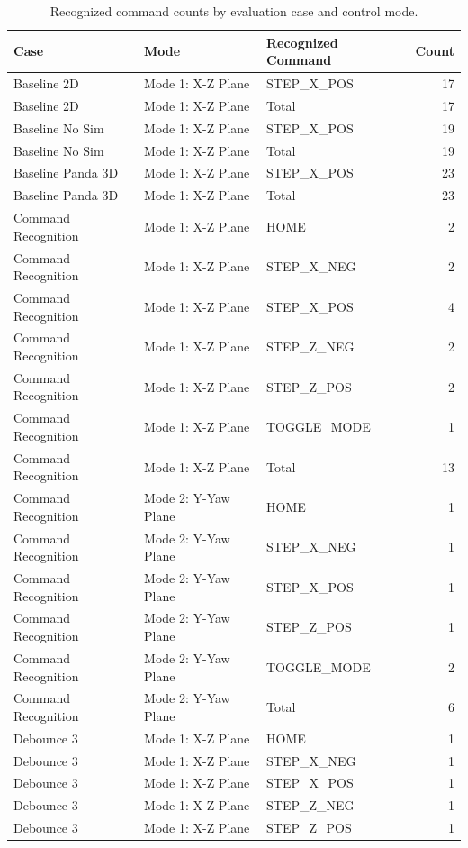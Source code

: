 \begin{table}[htbp]
\centering
\caption{Recognized command counts by evaluation case and control mode.}
\label{tab:recognized-commands-by-mode}
\begin{tabular}{lllr}
\toprule
Case & Mode & Recognized Command & Count \\
\midrule
Baseline 2D & Mode 1: X-Z Plane & STEP\_X\_POS & 17 \\
Baseline 2D & Mode 1: X-Z Plane & Total & 17 \\
Baseline No Sim & Mode 1: X-Z Plane & STEP\_X\_POS & 19 \\
Baseline No Sim & Mode 1: X-Z Plane & Total & 19 \\
Baseline Panda 3D & Mode 1: X-Z Plane & STEP\_X\_POS & 23 \\
Baseline Panda 3D & Mode 1: X-Z Plane & Total & 23 \\
Command Recognition & Mode 1: X-Z Plane & HOME & 2 \\
Command Recognition & Mode 1: X-Z Plane & STEP\_X\_NEG & 2 \\
Command Recognition & Mode 1: X-Z Plane & STEP\_X\_POS & 4 \\
Command Recognition & Mode 1: X-Z Plane & STEP\_Z\_NEG & 2 \\
Command Recognition & Mode 1: X-Z Plane & STEP\_Z\_POS & 2 \\
Command Recognition & Mode 1: X-Z Plane & TOGGLE\_MODE & 1 \\
Command Recognition & Mode 1: X-Z Plane & Total & 13 \\
Command Recognition & Mode 2: Y-Yaw Plane & HOME & 1 \\
Command Recognition & Mode 2: Y-Yaw Plane & STEP\_X\_NEG & 1 \\
Command Recognition & Mode 2: Y-Yaw Plane & STEP\_X\_POS & 1 \\
Command Recognition & Mode 2: Y-Yaw Plane & STEP\_Z\_POS & 1 \\
Command Recognition & Mode 2: Y-Yaw Plane & TOGGLE\_MODE & 2 \\
Command Recognition & Mode 2: Y-Yaw Plane & Total & 6 \\
Debounce 3 & Mode 1: X-Z Plane & HOME & 1 \\
Debounce 3 & Mode 1: X-Z Plane & STEP\_X\_NEG & 1 \\
Debounce 3 & Mode 1: X-Z Plane & STEP\_X\_POS & 1 \\
Debounce 3 & Mode 1: X-Z Plane & STEP\_Z\_NEG & 1 \\
Debounce 3 & Mode 1: X-Z Plane & STEP\_Z\_POS & 1 \\

\end{tabular}
\end{table}
